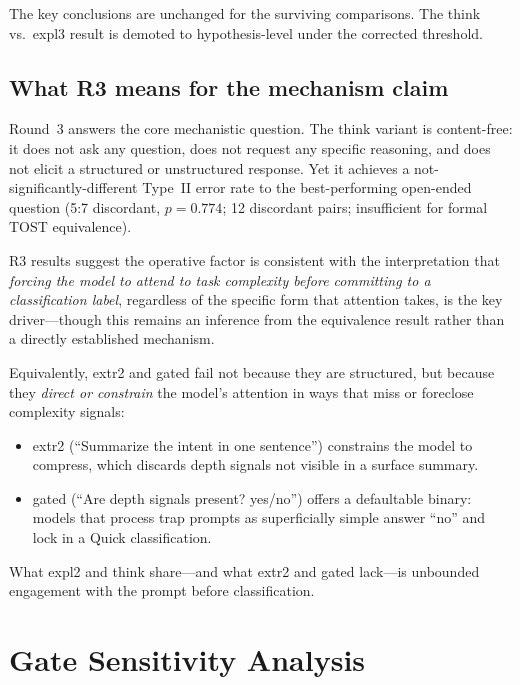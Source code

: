 \documentclass[11pt,a4paper]{article}
\begin{document}
The key conclusions are unchanged for the surviving comparisons.
The \textsf{think} vs.\ \textsf{expl3} result is demoted to
hypothesis-level under the corrected threshold.

\subsection{What R3 means for the mechanism claim}

Round~3 answers the core mechanistic question.  The \textsf{think} variant
is content-free: it does not ask any question, does not request any specific
reasoning, and does not elicit a structured or unstructured response.  Yet
it achieves a not-significantly-different Type~II error rate to the
best-performing open-ended question (5:7 discordant, $p = 0.774$; 12
discordant pairs; insufficient for formal TOST equivalence).

R3 results suggest the operative factor is consistent with the
interpretation that \emph{forcing the model to attend to task complexity
before committing to a classification label}, regardless of the specific
form that attention takes, is the key driver---though this remains an
inference from the equivalence result rather than a directly established
mechanism.

Equivalently, \textsf{extr2} and \textsf{gated} fail not because they are
structured, but because they \emph{direct or constrain} the model's attention
in ways that miss or foreclose complexity signals:
\begin{itemize}[noitemsep]
  \item \textsf{extr2} (``Summarize the intent in one sentence'') constrains
    the model to compress, which discards depth signals not visible in a
    surface summary.
  \item \textsf{gated} (``Are depth signals present? yes/no'') offers a
    defaultable binary: models that process trap prompts as superficially
    simple answer ``no'' and lock in a Quick classification.
\end{itemize}

What \textsf{expl2} and \textsf{think} share---and what \textsf{extr2} and
\textsf{gated} lack---is unbounded engagement with the prompt before
classification.

\section{Gate Sensitivity Analysis}
\label{sec:gate}
\end{document}
